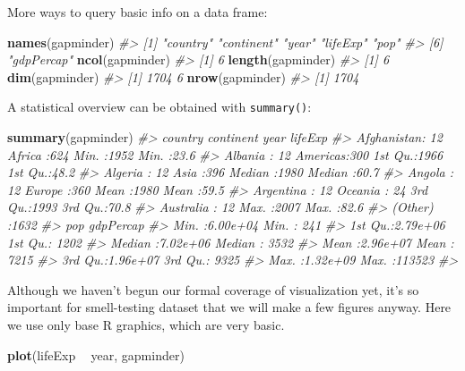 \documentclass[
]{book}
\newenvironment{Shaded}{\begin{snugshade}}{\end{snugshade}}
\newcommand{\CommentTok}[1]{\textcolor[rgb]{0.56,0.35,0.01}{\textit{#1}}}
\newcommand{\KeywordTok}[1]{\textcolor[rgb]{0.13,0.29,0.53}{\textbf{#1}}}
\newcommand{\NormalTok}[1]{#1}
\newcommand{\OperatorTok}[1]{\textcolor[rgb]{0.81,0.36,0.00}{\textbf{#1}}}
\newcommand{\StringTok}[1]{\textcolor[rgb]{0.31,0.60,0.02}{#1}}
\begin{document}
More ways to query basic info on a data frame:

\begin{Shaded}
\begin{Highlighting}[]
\KeywordTok{names}\NormalTok{(gapminder)}
\CommentTok{#> [1] "country"   "continent" "year"      "lifeExp"   "pop"      }
\CommentTok{#> [6] "gdpPercap"}
\KeywordTok{ncol}\NormalTok{(gapminder)}
\CommentTok{#> [1] 6}
\KeywordTok{length}\NormalTok{(gapminder)}
\CommentTok{#> [1] 6}
\KeywordTok{dim}\NormalTok{(gapminder)}
\CommentTok{#> [1] 1704    6}
\KeywordTok{nrow}\NormalTok{(gapminder)}
\CommentTok{#> [1] 1704}
\end{Highlighting}
\end{Shaded}

A statistical overview can be obtained with \texttt{summary()}:

\begin{Shaded}
\begin{Highlighting}[]
\KeywordTok{summary}\NormalTok{(gapminder)}
\CommentTok{#>         country        continent        year         lifeExp    }
\CommentTok{#>  Afghanistan:  12   Africa  :624   Min.   :1952   Min.   :23.6  }
\CommentTok{#>  Albania    :  12   Americas:300   1st Qu.:1966   1st Qu.:48.2  }
\CommentTok{#>  Algeria    :  12   Asia    :396   Median :1980   Median :60.7  }
\CommentTok{#>  Angola     :  12   Europe  :360   Mean   :1980   Mean   :59.5  }
\CommentTok{#>  Argentina  :  12   Oceania : 24   3rd Qu.:1993   3rd Qu.:70.8  }
\CommentTok{#>  Australia  :  12                  Max.   :2007   Max.   :82.6  }
\CommentTok{#>  (Other)    :1632                                               }
\CommentTok{#>       pop             gdpPercap     }
\CommentTok{#>  Min.   :6.00e+04   Min.   :   241  }
\CommentTok{#>  1st Qu.:2.79e+06   1st Qu.:  1202  }
\CommentTok{#>  Median :7.02e+06   Median :  3532  }
\CommentTok{#>  Mean   :2.96e+07   Mean   :  7215  }
\CommentTok{#>  3rd Qu.:1.96e+07   3rd Qu.:  9325  }
\CommentTok{#>  Max.   :1.32e+09   Max.   :113523  }
\CommentTok{#> }
\end{Highlighting}
\end{Shaded}

Although we haven't begun our formal coverage of visualization yet, it's so important for smell-testing dataset that we will make a few figures anyway. Here we use only base R graphics, which are very basic.

\begin{Shaded}
\begin{Highlighting}[]
\KeywordTok{plot}\NormalTok{(lifeExp }\OperatorTok{~}\StringTok{ }\NormalTok{year, gapminder)}
\end{Highlighting}
\end{Shaded}
\end{document}
